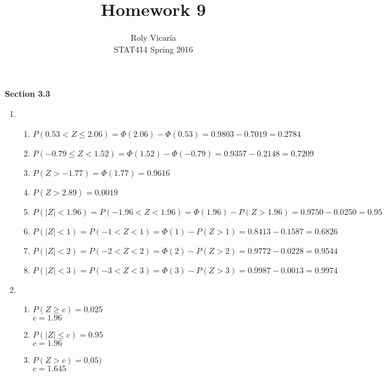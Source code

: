 \documentclass{article}
\title{Homework 9}
\author{Roly Vicar\'ia \\ STAT414 Spring 2016}
\begin{document}
    
    \maketitle
    
    \textbf{Section 3.3}
    \begin{enumerate}
     \item 
      \begin{enumerate}
       \item 
	$P(0.53 < Z \le 2.06) = \Phi(2.06) - \Phi(0.53) = 0.9803 - 0.7019 = 0.2784$
       
       \item 
	$P(-0.79 \le Z < 1.52) = \Phi(1.52) - \Phi(-0.79) = 0.9357 - 0.2148 = 0.7209$
       
       \item
	$P(Z > -1.77) = \Phi(1.77) = 0.9616$
       
       \item
	$P(Z > 2.89) = 0.0019$
       
       \item
	$P(|Z| < 1.96) = P(-1.96 < Z < 1.96) = \Phi(1.96) - P(Z > 1.96) = 0.9750 - 0.0250 = 0.95$
       
       \item
	$P(|Z| < 1) = P(-1 < Z < 1) = \Phi(1) - P(Z > 1) = 0.8413 - 0.1587 = 0.6826$
       
       \item
	$P(|Z| < 2) = P(-2 < Z < 2) = \Phi(2) - P(Z > 2) = 0.9772 - 0.0228 = 0.9544$
       
       \item
	$P(|Z| < 3) = P(-3 < Z < 3) = \Phi(3) - P(Z > 3) = 0.9987 - 0.0013 = 0.9974$
      \end{enumerate}
     \addtocounter{enumi}{1}
     
     \item
      \begin{enumerate}
       \item
	$P(Z \ge c) = 0.025$ \\
	$c = 1.96$
       
       \item
	$P(|Z| \le c) = 0.95$ \\
	$c = 1.96$
       
       \item
	$P(Z > c) = 0.05)$ \\
	$c = 1.645$
       

\end{enumerate}
\end{enumerate}
\end{document}
